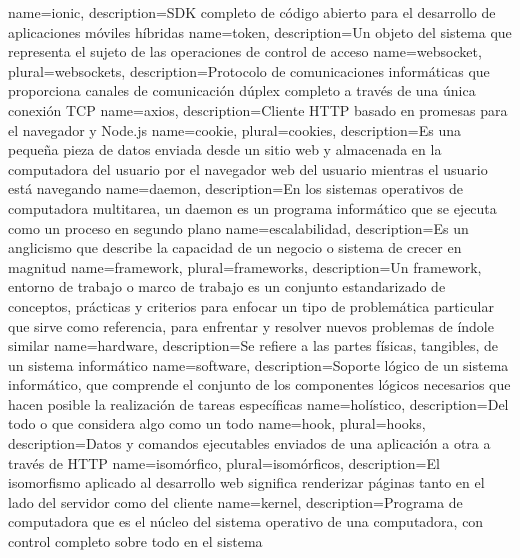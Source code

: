 {
    name=ionic,
    description={SDK completo de código abierto para el desarrollo de aplicaciones móviles híbridas}
}
{
    name=token,
    description={Un objeto del sistema que representa el sujeto de las operaciones de control de acceso}
}
{
    name=websocket,
    plural=websockets,
    description={Protocolo de comunicaciones informáticas que proporciona canales de comunicación dúplex completo a través de una única conexión TCP}
}
{
    name=axios,
    description={Cliente HTTP basado en promesas para el navegador y Node.js}
}
{
    name=cookie,
    plural=cookies,
    description={Es una pequeña pieza de datos enviada desde un sitio web y almacenada en la computadora del usuario por el navegador web del usuario mientras el usuario está navegando}
}
{
    name=daemon,
    description={En los sistemas operativos de computadora multitarea, un daemon es un programa informático que se ejecuta como un proceso en segundo plano}
}
{
    name=escalabilidad,
    description={Es un anglicismo que describe la capacidad de un negocio o sistema de crecer en magnitud}
}
{
    name=framework,
    plural=frameworks,
    description={Un framework, entorno de trabajo​ o marco de trabajo​ es un conjunto estandarizado de conceptos, prácticas y criterios para enfocar un tipo de problemática particular que sirve como referencia, para enfrentar y resolver nuevos problemas de índole similar}
}
{
    name=hardware,
    description={Se refiere a las partes físicas, tangibles, de un sistema informático}
}
{
    name=software,
    description={Soporte lógico de un sistema informático, que comprende el conjunto de los componentes lógicos necesarios que hacen posible la realización de tareas específicas}
}
{
    name=holístico,
    description={Del todo o que considera algo como un todo}
}
{
    name=hook,
    plural=hooks,
    description={Datos y comandos ejecutables enviados de una aplicación a otra a través de HTTP}
}
{
    name=isomórfico,
    plural=isomórficos,
    description={El isomorfismo aplicado al desarrollo web significa renderizar páginas tanto en el lado del servidor como del cliente}
}
{
    name=kernel,
    description={Programa de computadora que es el núcleo del sistema operativo de una computadora, con control completo sobre todo en el sistema}
}
